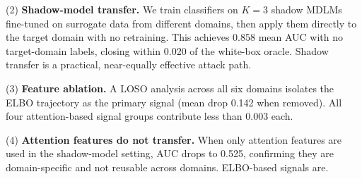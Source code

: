 (2) \textbf{Shadow-model transfer.} We train classifiers on $K=3$ shadow MDLMs
fine-tuned on surrogate data from different domains, then apply them directly
to the target domain with no retraining. This achieves 0.858 mean AUC with no
target-domain labels, closing within 0.020 of the white-box oracle.
Shadow transfer is a practical, near-equally effective attack path.

(3) \textbf{Feature ablation.} A LOSO analysis across all six domains isolates
the ELBO trajectory as the primary signal (mean drop 0.142 when removed).
All four attention-based signal groups contribute less than 0.003 each.

(4) \textbf{Attention features do not transfer.} When only attention features
are used in the shadow-model setting, AUC drops to 0.525, confirming they are
domain-specific and not reusable across domains. ELBO-based signals are.
